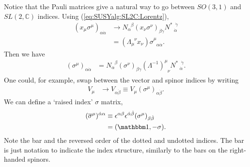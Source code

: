 \documentclass[12pt, oneside]{report}    %
\begin{document}
Notice that the Pauli matrices give a natural way to go between $SO(3,1)$ and $SL(2,\mathbb C)$ indices. Using  (\ref{eq:SUSYalg:SL2C:Lorentz}),
\begin{align}
    (x_\mu\sigma^\mu)_{\alpha\dot\alpha} &\rightarrow N_\alpha^{\phantom\alpha\beta}(x_\nu\sigma^\nu)_{\beta\dot\gamma}N^{*\phantom{\dot\alpha}\dot\gamma}_{\phantom *\dot\alpha}\\
    &= (\Lambda_\mu^{\phantom\mu\nu}x_\nu)\sigma^\mu_{\phantom\mu\alpha\dot\alpha}.
\end{align}
Then we have
\begin{align}
    (\sigma^\mu)_{\alpha\dot\alpha} &= N_\alpha^{\phantom\alpha\beta}(\sigma^\nu)_{\beta\dot\gamma}(\Lambda^{-1})^\mu_{\phantom\mu\nu}N^{*\phantom{\dot\alpha}\dot\gamma}_{\phantom*\dot\alpha}.
\end{align}
One could, for example, swap between the vector and spinor indices by writing
\begin{align}
    V_\mu & \rightarrow V_{\alpha\dot\beta} \equiv V_\mu (\sigma^\mu)_{\alpha\dot\beta}.\label{eq:SUSYalg:vecspinor}
\end{align} 
We can define a `raised index' $\sigma$ matrix,
\begin{align}
    (\overline\sigma^\mu)^{\dot\alpha\alpha} &\equiv \epsilon^{\alpha\beta}\epsilon^{\dot\alpha\dot\beta}(\sigma^\mu)_{\beta\dot\beta}\label{eq:SUSYalg:sigmamu}\\
    &= (\mathbbm 1, -{\mathbf{\sigma}}).\label{eq:SUSYalg:sigma-bar}
\end{align}
Note the bar and the reversed order of the dotted and undotted indices. The bar is just notation to indicate the index structure, similarly to the bars on the right-handed spinors. 
\end{document}
